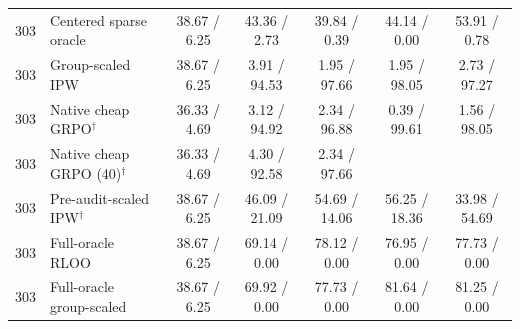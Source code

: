 \begin{tabular}{rlccccc}
303 & Centered sparse oracle & 38.67 / 6.25 & 43.36 / 2.73 & 39.84 / 0.39 & 44.14 / 0.00 & 53.91 / 0.78 \\
303 & Group-scaled IPW & 38.67 / 6.25 & 3.91 / 94.53 & 1.95 / 97.66 & 1.95 / 98.05 & 2.73 / 97.27 \\
303 & Native cheap GRPO$^\dagger$ & 36.33 / 4.69 & 3.12 / 94.92 & 2.34 / 96.88 & 0.39 / 99.61 & 1.56 / 98.05 \\
303 & Native cheap GRPO (40)$^\dagger$ & 36.33 / 4.69 & 4.30 / 92.58 & 2.34 / 97.66 &  &  \\
303 & Pre-audit-scaled IPW$^\dagger$ & 38.67 / 6.25 & 46.09 / 21.09 & 54.69 / 14.06 & 56.25 / 18.36 & 33.98 / 54.69 \\
303 & Full-oracle RLOO & 38.67 / 6.25 & 69.14 / 0.00 & 78.12 / 0.00 & 76.95 / 0.00 & 77.73 / 0.00 \\
303 & Full-oracle group-scaled & 38.67 / 6.25 & 69.92 / 0.00 & 77.73 / 0.00 & 81.64 / 0.00 & 81.25 / 0.00 \\
\bottomrule
\end{tabular}
